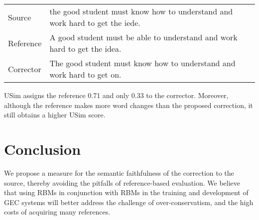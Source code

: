 \documentclass[a4paper, 11pt]{article}
\begin{document}
\begin{table}[h!]
	\vspace{-.3cm}
  \centering
  \label{ex:sensitive}
  \begin{tabular}{p{}p{}}
    Source    & \small the good student must know how to understand and work hard to get the iede.\\
    Reference & \small A good student must be able to understand and work hard to get the idea.\\
    Corrector & \small The good student must know how to understand and work hard to get on.     
  \end{tabular}
  
  \vspace{-.3cm}
\end{table}

{\sc USim} assigns the reference 0.71 and only 0.33 to the corrector.
Moreover, although the reference makes more word changes than the proposed correction,
it still obtains a higher {\sc USim} score.


%
%
%
\vspace{-.1cm}
\section{Conclusion}
\vspace{-.1cm}

We propose a measure for the semantic faithfulness of the correction to the source,
thereby avoiding the pitfalls of reference-based evaluation. We believe that using RBMs in conjunction with RBMs in the training and development of GEC
systems will better address the challenge of over-conservatism, and the 
high costs of acquiring many references.
\end{document}
